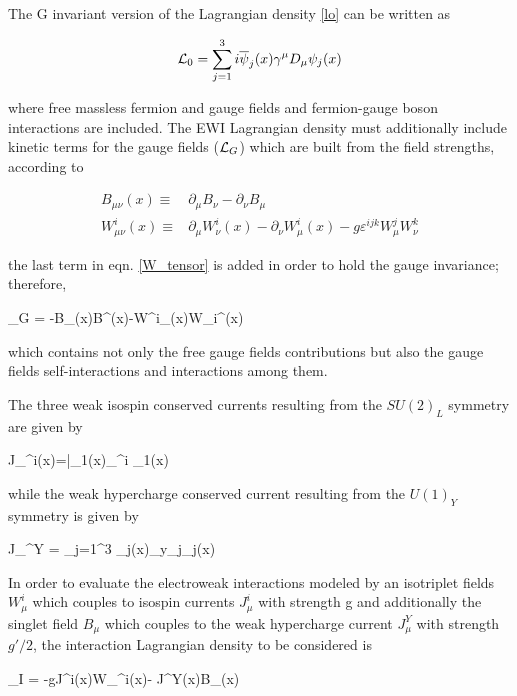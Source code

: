 \noindent The G invariant version of the Lagrangian density \ref{lo} can be written as

\begin{equation}\label{linv}
\mathcal{L}_0 = \sum_{j=1}^3 i\overline{\psi}_j(x)\gamma^\mu D_\mu \psi_j(x)
\end{equation}

\noindent where free massless fermion and gauge fields and fermion-gauge boson interactions are included. The EWI Lagrangian density must additionally include kinetic terms for the gauge fields ($\mathcal{L}_G$) which are built from the field strengths, according to

\begin{align}
B_{\mu\nu}(x)   \equiv & \partial_\mu B_\nu -  \partial_\nu B_\mu \label{B_tensor} \\ 
W^i_{\mu\nu}(x) \equiv & \partial_\mu W^i_\nu(x) - \partial_\nu W^i_\mu(x) - g\varepsilon^{ijk}W^j_\mu W^k_\nu \label{W_tensor}
\end{align}

\noindent the last term in eqn. \ref{W_tensor} is added in order to hold the gauge invariance; therefore,

\beqn\label{lg}
\Lagr_G = -B_{\mu\nu}(x)B^{\mu\nu}(x)-W^i_{\mu\nu}(x)W_i^{\mu\nu}(x)
\eeqn

\noindent which contains not only the free gauge fields contributions but also the gauge fields self-interactions and interactions among them.  

\noindent The three weak isospin conserved currents resulting from the $SU(2)_L$ symmetry are given by

\beqn
J_\mu^i(x)=\bar{\psi_1}(x)\gamma_\mu \sigma^i \psi_1(x) 
\eeqn

\noindent while the weak hypercharge conserved current resulting from the $U(1)_Y$ symmetry is given by 

\beqn
J_\mu^Y = \sum_{j=1}^3 \overline{\psi}_j(x)\gamma_\mu y_j\psi_j(x)
\eeqn

\noindent In order to evaluate the electroweak interactions modeled by an isotriplet fields $W^i_\mu$ which couples to isospin currents $J^i_\mu$ with strength g and additionally the singlet field $B_\mu$ which couples to the weak hypercharge current $J_\mu^Y$ with strength $g'/2$, the interaction Lagrangian density to be considered is

\beqn
\Lagr_I = -gJ^{i\mu}(x)W_\mu^i(x)- J^{Y\mu}(x)B_\mu(x)
\eeqn


